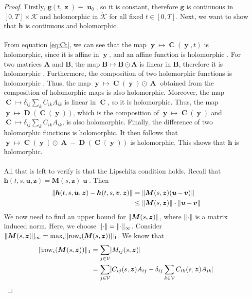 \documentclass[12pt, oneside]{report}   	%
\DeclarePairedDelimiter{\abs}{\lvert}{\rvert}
\DeclarePairedDelimiter{\norm}{\lVert}{\rVert}        %
\DeclareMathOperator{\Adj}{\boldsymbol{A}}
\DeclareMathOperator{\CC}{\boldsymbol{C}}
\DeclareMathOperator{\MM}{\boldsymbol{M}}
\DeclareMathOperator{\DD}{\boldsymbol{D}}
\DeclareMathOperator{\uu}{\boldsymbol{u}}
\DeclareMathOperator{\y}{\boldsymbol{y}}
\DeclareMathOperator{\z}{\boldsymbol{z}}
\DeclareMathOperator{\vv}{\boldsymbol{v}}
\begin{document}
\begin{proof}
\noindent Firstly, $\boldsymbol{g}(t,\z)\equiv \uu_0$, so it is constant, therefore $\boldsymbol{g}$ is continuous in $[0,T]\times\mathcal{K}$ and holomorphic in $\mathring{\mathcal{K}}$ for all fixed $t\in [0,T]$. Next, we want to show that $\boldsymbol{h}$ is continuous and holomorphic.\\\\
From equation \eqref{eq:Ct}, we can see that the map $\y\mapsto\CC(\y,t)$ is holomorphic, since it is affine in $\y$, and an affine function is holomorphic \cite{henrici1993applied}. For two matrices $\boldsymbol{A}$ and $\boldsymbol{B}$, the map $\boldsymbol{B}\mapsto\boldsymbol{B}\odot\boldsymbol{A}$ is linear in $\boldsymbol{B}$, therefore it is holomorphic \cite{henrici1993applied}. Furthermore, the composition of two holomorphic functions is holomorphic \cite{henrici1993applied}. Thus, the map $\y\mapsto\CC(\y)\odot\Adj$ obtained from the composition of holomorphic maps is also holomorphic. Moreover, the map $\CC\mapsto\delta_{ij}\sum_k C_{ik}A_{ik}$ is linear in $\CC$, so it is holomorphic. Thus, the map $\y\mapsto\DD(\CC(\y))$, which is the composition of $\y\mapsto\CC(\y)$ and $\CC\mapsto\delta_{ij}\sum_k C_{ik}A_{ik}$, is also holomorphic. Finally, the difference of two holomorphic functions is holomorphic. It then follows that $\y\mapsto\CC(\y)\odot\Adj - \DD(\CC(\y))$ is holomorphic. This shows that $\boldsymbol{h}$ is holomorphic.\\\\
All that is left to verify is that the Lipschitz condition holds. Recall that $\boldsymbol{h}(t,s,\boldsymbol{u},\boldsymbol{z})=\boldsymbol{M}(s,\boldsymbol{z})\uu$. Then
\begin{align*}
    \norm{\boldsymbol{h}(t,s,\boldsymbol{u},\boldsymbol{z}) - \boldsymbol{h}(t,s,\boldsymbol{v},\boldsymbol{z})} &= \norm{\MM(s,\boldsymbol{z})(\uu-\vv)} \\
    &\leq \norm{\MM(s,\boldsymbol{z})}\cdot\norm{\uu-\vv}
\end{align*}
We now need to find an upper bound for $\norm{\MM(s,\boldsymbol{z})}$, where $\norm{\cdot}$ is a matrix induced norm. Here, we choose $\norm{\cdot}=\norm{\cdot}_\infty$. Consider $\norm{\MM(s,\boldsymbol{z})}_\infty = \max_i\norm{\mathrm{row}_i(\MM(s,\boldsymbol{z}))}_1$. We know that
\begin{align*}
    \norm{\mathrm{row}_i(\MM(s,\boldsymbol{z}))}_1 &= \sum_{j\in\mathcal{V}}\abs{M_{ij}(s,\boldsymbol{z})} \\
    &= \sum_{j\in\mathcal{V}}\abs{C_{ij}(s,\boldsymbol{z})A_{ij} - \delta_{ij}\sum_{k\in\mathcal{V}}C_{ik}(s,\boldsymbol{z})A_{ik}} \\

\end{align*}
\end{proof}
\end{document}
